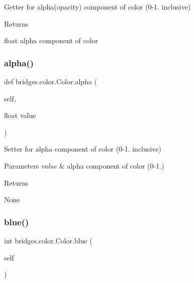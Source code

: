 Getter for alpha(opacity) component of color (0-\/1. inclusive) 

\begin{DoxyReturn}{Returns}


float alpha component of color 
\end{DoxyReturn}
\mbox{\label{classbridges_1_1color_1_1_color_a83fb51809b6fec53a1ce4a5419e97498}} 
\subsubsection{\texorpdfstring{alpha()}{alpha()}\hspace{0.1cm}{\footnotesize\ttfamily [2/2]}}
{\footnotesize\ttfamily def bridges.\+color.\+Color.\+alpha (\begin{DoxyParamCaption}\item[{}]{self,  }\item[{float}]{value }\end{DoxyParamCaption})}



Setter for alpha component of color (0-\/1. inclusive) 


\begin{DoxyParams}{Parameters}
{\em value} & alpha component of color (0-\/1.) \\
\hline
\end{DoxyParams}
\begin{DoxyReturn}{Returns}


None 
\end{DoxyReturn}
\mbox{\label{classbridges_1_1color_1_1_color_a126bfa0dc440db085a145f05952c8110}} 
\subsubsection{\texorpdfstring{blue()}{blue()}\hspace{0.1cm}{\footnotesize\ttfamily [1/2]}}
{\footnotesize\ttfamily  int bridges.\+color.\+Color.\+blue (\begin{DoxyParamCaption}\item[{}]{self }\end{DoxyParamCaption})}



